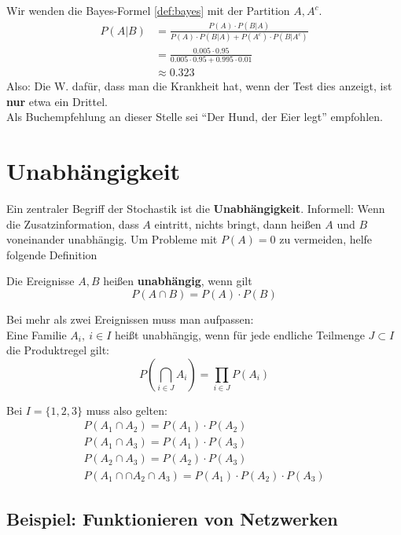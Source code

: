 Wir wenden die Bayes-Formel \eqref{def:bayes} mit der Partition $A,A^c$.
\begin{eqnarray*}
	P(A|B)	&= \frac{P(A)\cdot P(B|A)}{P(A)\cdot P(B|A) + P(A^c)\cdot P(B|A^c)} \\
			&= \frac{0.005 \cdot 0.95}{0.005 \cdot 0.95 + 0.995 \cdot 0.01} \\
			&\approx 0.323
\end{eqnarray*}
Also: Die W. dafür, dass man die Krankheit hat, wenn der Test dies anzeigt, ist \textbf{nur} etwa ein Drittel.\\
Als Buchempfehlung an dieser Stelle sei ``Der Hund, der Eier legt'' empfohlen. %

\section{Unabhängigkeit}

Ein zentraler Begriff der Stochastik ist die \textbf{Unabhängigkeit}.
Informell: Wenn die Zusatzinformation, dass $A$ eintritt, nichts bringt, dann heißen $A$ und $B$ voneinander unabhängig.
Um Probleme mit $P(A)=0$ zu vermeiden, helfe folgende Definition

Die Ereignisse $A,B$ heißen \textbf{unabhängig}, wenn gilt
\begin{equation}
	P(A \cap B) = P(A) \cdot P(B)
\end{equation}

Bei mehr als zwei Ereignissen muss man aufpassen:\\
Eine Familie $A_i,\ i\in I$ heißt unabhängig, wenn für jede endliche Teilmenge $J \subset I$ die Produktregel gilt:
\begin{equation}
	P\left( \bigcap_{i\in J}A_i\right) = \prod_{i\in J} P(A_i)
\end{equation}

Bei $I=\{1,2,3\}$ muss also gelten:
\begin{eqnarray*}
	P(A_1 \cap A_2) = P(A_1)\cdot P(A_2) \\
	P(A_1 \cap A_3) = P(A_1)\cdot P(A_3) \\
	P(A_2 \cap A_3) = P(A_2)\cdot P(A_3) \\
	P(A_1 \cap \cap A_2 \cap A_3) = P(A_1)\cdot P(A_2)\cdot P(A_3)
\end{eqnarray*}

\subsection{Beispiel: Funktionieren von Netzwerken}

